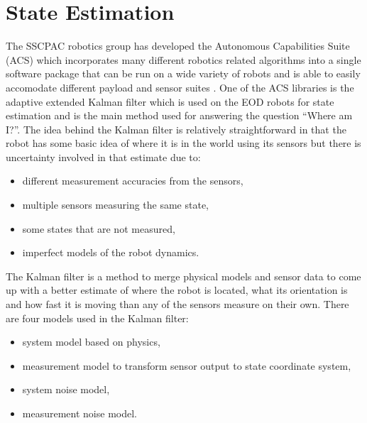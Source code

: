 \chapter{State Estimation}
\label{ch:estimation}
The SSCPAC robotics group has developed the Autonomous Capabilities Suite (ACS) which incorporates many different robotics related algorithms into a single software package that can be run on a wide variety of robots and is able to easily accomodate different payload and sensor suites \cite{Sights06}. One of the ACS libraries is the adaptive extended Kalman filter which is used on the EOD robots for state estimation and is the main method used for answering the question ``Where am I?''. The idea behind the Kalman filter is relatively straightforward in that the robot has some basic idea of where it is in the world using its sensors but there is uncertainty involved in that estimate due to:
\begin{itemize}
\item different measurement accuracies from the sensors,
\item multiple sensors measuring the same state,
\item some states that are not measured,
\item imperfect models of the robot dynamics.
\end{itemize}

The Kalman filter is a method to merge physical models and sensor data to come up with a better estimate of where the robot is located, what its orientation is and how fast it is moving than any of the sensors measure on their own. There are four models used in the Kalman filter:
\begin{itemize}
\item system model based on physics,
\item measurement model to transform sensor output to state coordinate system,
\item system noise model,
\item measurement noise model.
\end{itemize}



